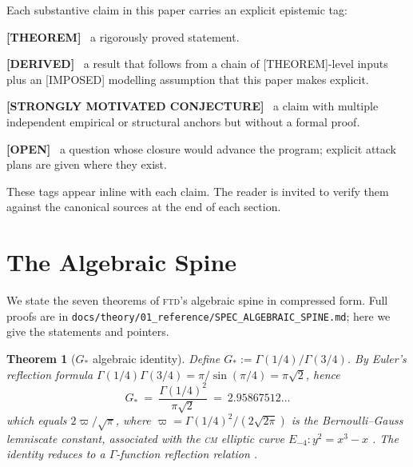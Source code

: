\documentclass[11pt,reqno]{amsart}
\theoremstyle{plain}
\newtheorem{theorem}{Theorem}[section]
\theoremstyle{definition}
\theoremstyle{remark}
\numberwithin{equation}{section}
\newcommand{\Gstar}{G_{\!*}}
\newcommand{\FTD}{\textsc{ftd}}
\newenvironment{epistemic}[1]{\par\medskip\noindent\textbf{[#1]}\ }{\par\medskip}
\begin{document}
Each substantive claim in this paper carries an explicit epistemic
tag:

\begin{epistemic}{THEOREM} a rigorously proved statement.
\end{epistemic}

\begin{epistemic}{DERIVED} a result that follows from a chain of
[THEOREM]-level inputs plus an [IMPOSED] modelling assumption that
this paper makes explicit.
\end{epistemic}

\begin{epistemic}{STRONGLY MOTIVATED CONJECTURE} a claim with
multiple independent empirical or structural anchors but without a
formal proof.
\end{epistemic}

\begin{epistemic}{OPEN} a question whose closure would advance the
program; explicit attack plans are given where they exist.
\end{epistemic}

These tags appear inline with each claim. The reader is invited to
verify them against the canonical sources at the end of each section.

\section{The Algebraic Spine}
\label{sec:spine}

We state the seven theorems of \FTD's algebraic spine in compressed
form. Full proofs are in \texttt{docs/theory/01\_reference/SPEC\_ALGEBRAIC\_SPINE.md};
here we give the statements and pointers.

\begin{theorem}[$\Gstar$ algebraic identity]
\label{thm:gstar}
Define $\Gstar := \Gamma(1/4)/\Gamma(3/4)$. By Euler's reflection
formula $\Gamma(1/4)\Gamma(3/4) = \pi/\sin(\pi/4) = \pi\sqrt{2}$,
hence
\[
  \Gstar\ =\ \frac{\Gamma(1/4)^{2}}{\pi\sqrt{2}}\ =\ 2.95867512\ldots
\]
which equals $2\varpi/\sqrt{\pi}$, where $\varpi = \Gamma(1/4)^{2}/(2\sqrt{2\pi})$
is the Bernoulli--Gauss lemniscate constant, associated with
the \textsc{cm} elliptic curve $E_{-4}\colon y^{2} = x^{3} - x$
\cite{borweinandborwein,gauss-werke}. The identity reduces to a
$\Gamma$-function reflection relation \cite[\S 2]{spinedoc}.
\end{theorem}
\end{document}
